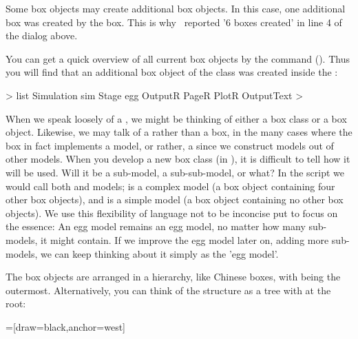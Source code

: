 Some box objects may create additional box objects. In this case, one additional box was created by the  box. This is why \US\ reported '6 boxes created' in line 4 of the dialog above.

You can get a quick overview of all current box objects by the  command (). Thus you will find that an additional box object of the  class was created inside the :

\lstset{numbers=left}
\begin{usdialog}
> list
Simulation sim
  Stage egg
  OutputR 
    PageR 
      PlotR 
    OutputText 
>
\end{usdialog}
\lstset{numbers=none}

When we speak loosely of a , we might be thinking of either  a box class or a box object. Likewise, we may talk of a  rather than a box, in the many cases where the box in fact implements a model, or rather, a  since we construct models out of other models. When you develop a new box class (in \CPP), it is difficult to tell how it will be used. Will it be a sub-model, a sub-sub-model, or what? In the  script we would call both  and  models;  is a complex model (a box object containing four other box objects), and  is a simple model (a box object containing no other box objects). We use this flexibility of language not to be inconcise put to focus on the essence: An egg model remains an egg model, no matter how many sub-models, it might contain. If we improve the egg model later on, adding more sub-models, we can keep thinking about it simply as the 'egg model'.

The box objects are arranged in a hierarchy, like Chinese boxes, with  being the outermost. Alternatively, you can think of the structure as a tree with  at the root:

\medskip
{}=[draw=black,anchor=west]

